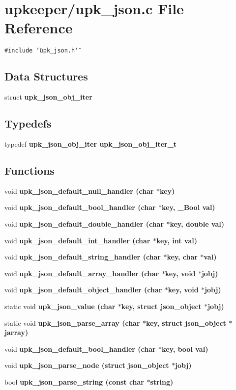 \section{upkeeper/upk\_\-json.c File Reference}
\label{upk__json_8c}
{\tt \#include \char`\"{}upk\_\-json.h\char`\"{}}\par
\subsection*{Data Structures}
\begin{CompactItemize}
\item 
struct \bf{upk\_\-json\_\-obj\_\-iter}
\end{CompactItemize}
\subsection*{Typedefs}
\begin{CompactItemize}
\item 
typedef \bf{upk\_\-json\_\-obj\_\-iter} \bf{upk\_\-json\_\-obj\_\-iter\_\-t}
\end{CompactItemize}
\subsection*{Functions}
\begin{CompactItemize}
\item 
void \bf{upk\_\-json\_\-default\_\-null\_\-handler} (char $\ast$key)
\item 
void \bf{upk\_\-json\_\-default\_\-bool\_\-handler} (char $\ast$key, \_\-Bool val)
\item 
void \bf{upk\_\-json\_\-default\_\-double\_\-handler} (char $\ast$key, double val)
\item 
void \bf{upk\_\-json\_\-default\_\-int\_\-handler} (char $\ast$key, int val)
\item 
void \bf{upk\_\-json\_\-default\_\-string\_\-handler} (char $\ast$key, char $\ast$val)
\item 
void \bf{upk\_\-json\_\-default\_\-array\_\-handler} (char $\ast$key, void $\ast$jobj)
\item 
void \bf{upk\_\-json\_\-default\_\-object\_\-handler} (char $\ast$key, void $\ast$jobj)
\item 
static void \bf{upk\_\-json\_\-value} (char $\ast$key, struct json\_\-object $\ast$jobj)
\item 
static void \bf{upk\_\-json\_\-parse\_\-array} (char $\ast$key, struct json\_\-object $\ast$jarray)
\item 
void \bf{upk\_\-json\_\-default\_\-bool\_\-handler} (char $\ast$key, bool val)
\item 
void \bf{upk\_\-json\_\-parse\_\-node} (struct json\_\-object $\ast$jobj)
\item 
bool \bf{upk\_\-json\_\-parse\_\-string} (const char $\ast$string)
\end{CompactItemize}
